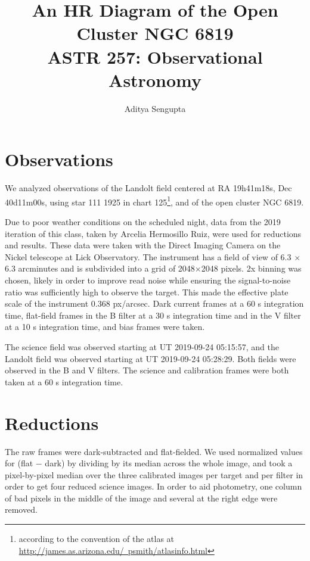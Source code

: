 \documentclass{article}
\title{An HR Diagram of the Open Cluster NGC 6819 \\ ASTR 257: Observational Astronomy}
\author{Aditya Sengupta}
\begin{document}
    \maketitle
    \section{Observations}

    We analyzed observations of the Landolt field centered at RA 19h41m18s, Dec 40d11m00s, using star 111 1925 in chart 125\footnote{according to the convention of the atlas at \href{http://james.as.arizona.edu/~psmith/atlasinfo.html}{http://james.as.arizona.edu/~psmith/atlasinfo.html}}, and of the open cluster NGC 6819. 

    Due to poor weather conditions on the scheduled night, data from the 2019 iteration of this class, taken by Arcelia Hermosillo Ruiz, were used for reductions and results. These data were taken with the Direct Imaging Camera on the Nickel telescope at Lick Observatory. The instrument has a field of view of 6.3 $\times$ 6.3 arcminutes and is subdivided into a grid of 2048$\times$2048 pixels. 2x binning was chosen, likely in order to improve read noise while ensuring the signal-to-noise ratio was sufficiently high to observe the target. This made the effective plate scale of the instrument 0.368 px/arcsec. Dark current frames at a 60 s integration time, flat-field frames in the B filter at a 30 s integration time and in the V filter at a 10 s integration time, and bias frames were taken. 
    
    The science field was observed starting at UT 2019-09-24 05:15:57, and the Landolt field was observed starting at UT 2019-09-24 05:28:29. Both fields were observed in the B and V filters. The science and calibration frames were both taken at a 60 s integration time.

    \section{Reductions}

    The raw frames were dark-subtracted and flat-fielded. We used normalized values for (flat $-$ dark) by dividing by its median across the whole image, and took a pixel-by-pixel median over the three calibrated images per target and per filter in order to get four reduced science images. In order to aid photometry, one column of bad pixels in the middle of the image and several at the right edge were removed. 
\end{document}
